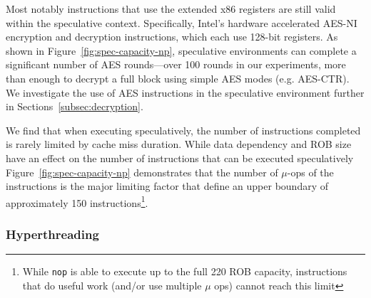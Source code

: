 % 

Most notably instructions that use the extended x86 registers are still valid
within the speculative context. Specifically, Intel's hardware accelerated
AES-NI encryption and decryption instructions, which each use 128-bit registers.
As shown in Figure~\ref{fig:spec-capacity-np}, speculative environments can
complete a significant number of AES rounds---over 100 rounds in our
experiments, more than enough to decrypt a
full block using simple AES modes (e.g. AES-CTR). We investigate the use of AES
instructions in the speculative environment further in
Sections~\ref{subsec:decryption}.

\medskip

We find that when executing speculatively, the number of instructions completed
is rarely limited by cache miss duration. While data dependency and ROB size
have an effect on the number of instructions that can be executed speculatively
Figure~\ref{fig:spec-capacity-np} demonstrates that the number of $\mu$-ops of
the instructions is the major limiting factor that define an upper boundary of
approximately 150 instructions\footnote{While \texttt{nop} is able to execute up
to the full 220 ROB capacity, instructions that do useful work (and/or use
multiple $\mu$ ops) cannot reach this limit}.



\subsubsection{Hyperthreading}
\label{sssec:hyperthread}

\FigSpecMeasureParity

